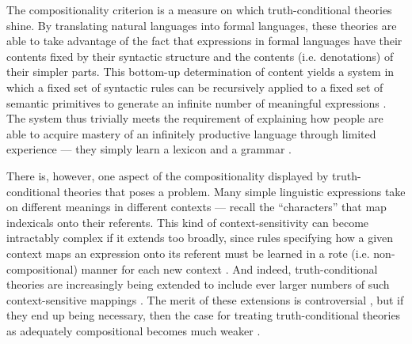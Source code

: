 The compositionality criterion is a measure on which truth-conditional theories shine. By translating natural languages into formal languages, these theories are able to take advantage of the fact that expressions in formal languages have their contents fixed by their syntactic structure and the contents (i.e. denotations) of their simpler parts. This bottom-up determination of content yields a system in which a fixed set of syntactic rules can be recursively applied to a fixed set of semantic primitives to generate an infinite number of meaningful expressions \citep{Szabo:2013}. The system thus trivially meets the requirement of explaining how people are able to acquire mastery of an infinitely productive language through limited experience --- they simply learn a lexicon and a grammar \citep{Pinker:1994}. 

There is, however, one aspect of the compositionality displayed by truth-conditional theories that poses a problem. Many simple linguistic expressions take on different meanings in different contexts --- recall the ``characters'' that map indexicals onto their referents. This kind of context-sensitivity can become intractably complex if it extends too broadly, since rules specifying how a given context maps an expression onto its referent must be learned in a rote (i.e. non-compositional) manner for each new context \citep{Unnsteinsson:2014}. And indeed, truth-conditional theories are increasingly being extended to include ever larger numbers of such context-sensitive mappings \citep{Recanati:2012,Unnsteinsson:2014}. The merit of these extensions is controversial \citep{CappelenLepore:2005}, but if they end up being necessary, then the case for treating truth-conditional theories as adequately compositional becomes much weaker \citep{Unnsteinsson:2014}. 

